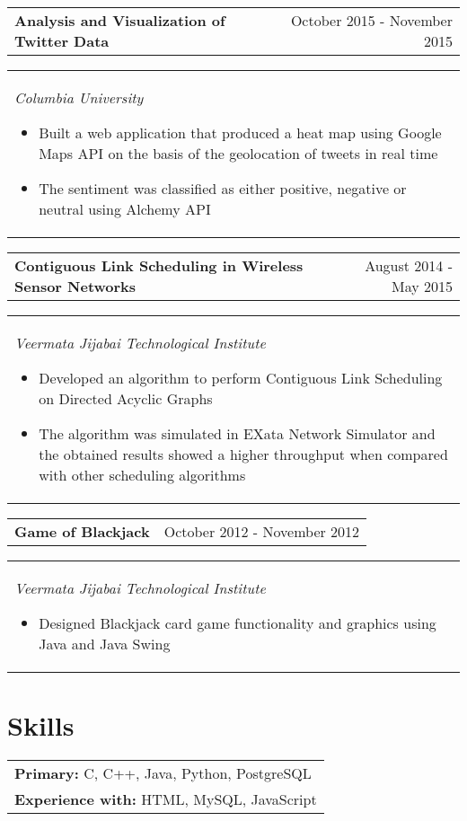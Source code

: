 \documentclass[margin,line]{res}
\begin{document}
\begin{resume}
\begin{tabular}{p{3.875in} r}
\bf Analysis and Visualization of Twitter Data & October 2015 - November 2015
\end{tabular}
\begin{tabular}{p{5.92in}}
\it Columbia University
\begin{itemize}
    \item \textup{Built a web application that produced a heat map using Google Maps API on the basis of the geolocation of tweets in real time}
    \item \textup{The sentiment was classified as either positive, negative or neutral using Alchemy API}
\end{itemize}
\end{tabular}


\begin {tabular} {p{4.25in} r}
\bf Contiguous Link Scheduling in Wireless Sensor Networks & August 2014 - May 2015
\end{tabular}
\begin{tabular}{p{5.92in}}
\it Veermata Jijabai Technological Institute 
\begin{itemize}
    \item \textup{Developed an algorithm to perform Contiguous Link Scheduling on Directed Acyclic Graphs}
    \item \textup{The algorithm was simulated in EXata Network Simulator and the obtained results showed a higher throughput when compared with other scheduling algorithms}
\end{itemize}
\end{tabular}


\begin{tabular}{p{3.875in} r}
\bf Game of Blackjack   & October 2012 - November 2012
\end{tabular}
\begin{tabular} {p{5.92in}}
\it Veermata Jijabai Technological Institute
\begin{itemize}
    \item \textup{Designed Blackjack card game functionality and graphics using Java and Java Swing }
\end{itemize}
\end{tabular}


\section{\sc\bf Skills}
\begin{tabular}{p{5.92in}}
{\bf Primary:} C, C++, Java, Python, PostgreSQL\\
{\bf Experience with:} HTML, MySQL, JavaScript
\end{tabular}


\end{resume}
\end{document}
